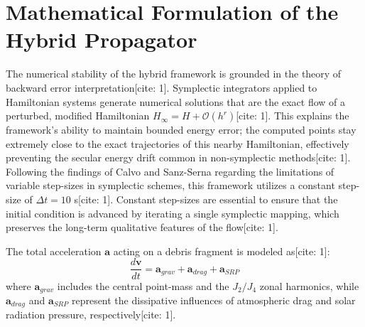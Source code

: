 \documentclass[conf]{AAS} %
\begin{document}
\section{Mathematical Formulation of the Hybrid Propagator}
\label{sec:mathematical_formulation}

The numerical stability of the hybrid framework is grounded in the theory of backward error interpretation[cite: 1]. Symplectic integrators applied to Hamiltonian systems generate numerical solutions that are the exact flow of a perturbed, modified Hamiltonian $H_{\infty} = H + \mathcal{O}(h^r)$[cite: 1]. This explains the framework's ability to maintain bounded energy error; the computed points stay extremely close to the exact trajectories of this nearby Hamiltonian, effectively preventing the secular energy drift common in non-symplectic methods[cite: 1]. Following the findings of Calvo and Sanz-Serna regarding the limitations of variable step-sizes in symplectic schemes, this framework utilizes a constant step-size of $\Delta t = 10$ s[cite: 1]. Constant step-sizes are essential to ensure that the initial condition is advanced by iterating a single symplectic mapping, which preserves the long-term qualitative features of the flow[cite: 1].

The total acceleration $\mathbf{a}$ acting on a debris fragment is modeled as[cite: 1]:
\begin{equation}
    \frac{d\mathbf{v}}{dt} = \mathbf{a}_{grav} + \mathbf{a}_{drag} + \mathbf{a}_{SRP}
    \label{eq:total_accel}
\end{equation}
where $\mathbf{a}_{grav}$ includes the central point-mass and the $J_2/J_4$ zonal harmonics, while $\mathbf{a}_{drag}$ and $\mathbf{a}_{SRP}$ represent the dissipative influences of atmospheric drag and solar radiation pressure, respectively[cite: 1].
\end{document}
